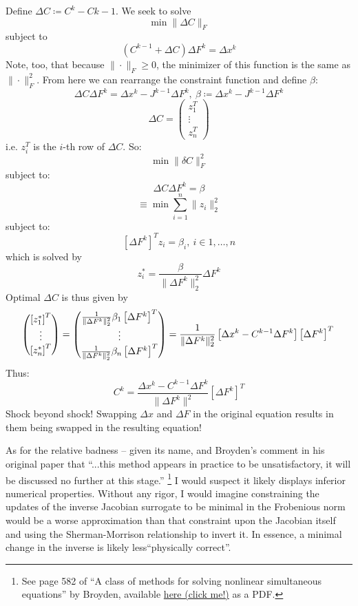 \documentclass[11pt]{report}
\theoremstyle{definition}
\begin{document}
Define $\Delta C \coloneqq C^{k} - C{k-1}$. We seek to solve
\[\min\|\Delta C\|_F\]
subject to
\[(C^{k-1}+\Delta C)\Delta F^k = \Delta x^{k}\]
Note, too, that because $\|\cdot\|_F\geq 0$, the minimizer of this function is the same as $\|\cdot\|_F^2$.
From here we can rearrange the constraint function and define $\beta$:
\[ \Delta C \Delta F^{k} = \Delta x^k - J^{k-1}\Delta F^{k},\ \beta\coloneqq \Delta x^k - J^{k-1}\Delta F^{k}\]
\[
	\Delta C = \begin{pmatrix}
		z_1^T \\ \vdots \\ z_n^T
	\end{pmatrix}
\]
i.e. $z_i^T$ is the $i$-th row of $\Delta C$. So:
\[ \min\|\delta C\|_F^2 \]
subject to:
\[ \Delta C \Delta F^k = \beta\]
\[\equiv \min \sum_{i=1}^{n}\|z_i\|_2^2\]
subject to:
\[\left[\Delta F^{k}\right]^Tz_i = \beta_i,\ i\in1,\ldots,n\]
which is solved by
\[z_i^* = \frac{\beta}{\|\Delta F^{k}\|_2^2}\Delta F^k\]
Optimal $\Delta C$ is thus given by
\[
	\begin{pmatrix}
		\left[z_1^*\right]^T \\
		\vdots               \\
		\left[z_n^*\right]^T
	\end{pmatrix}
	= \begin{pmatrix}
		\frac{1}{\|\Delta F^k\|_2^2} \beta_1 \left[\Delta F^k\right]^T \\
		\vdots                                                         \\
		\frac{1}{\|\Delta F^k\|_2^2} \beta_n \left[\Delta F^k\right]^T \\
	\end{pmatrix}
	=
	\frac{1}{\|\Delta F^k\|_2^2} \left[\Delta x^k - C^{k-1}\Delta F^k\right] \left[\Delta F^k\right]^T \\
\]
Thus:
\[
	C^{k} = \frac{\Delta x^k-C^{k-1}\Delta F^k}{\|\Delta F^{k}\|^2}\left[\Delta F^{k}\right]^{T}
\]
Shock beyond shock! Swapping $\Delta x$ and $\Delta F$ in the original equation
results in them being swapped in the resulting equation!

As for the relative badness -- given its name, and Broyden's comment in his original paper that
``...this method appears in practice to be unsatisfactory, it will be discussed no further at this stage.''
\footnote{See page 582 of ``A class of methods for solving nonlinear simultaneous equations'' by Broyden, available
	\href{https://www.ams.org/journals/mcom/1965-19-092/S0025-5718-1965-0198670-6/}{here (click me!)} as a PDF.}
I would suspect it likely displays inferior numerical properties. Without any rigor, I would imagine constraining
the updates of the inverse Jacobian surrogate to be minimal in the Frobenious norm would be a worse approximation
than that constraint upon the Jacobian itself and using the Sherman-Morrison relationship to invert it. In essence,
a minimal change in the inverse is likely less``physically correct''.
\end{document}
